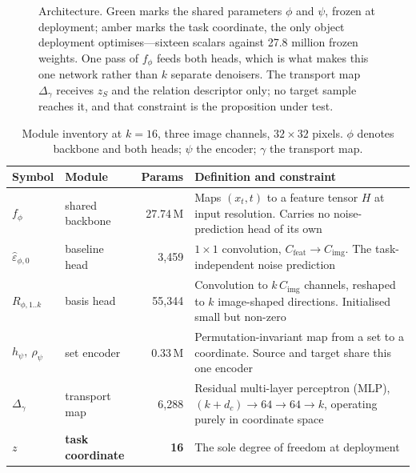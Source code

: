 \documentclass[11pt]{article}
\newcommand{\epshat}{\hat{\varepsilon}}
\newcommand{\zS}{z_{S}}
\begin{document}
\begin{figure}[htbp]
{}


\caption{Architecture. Green marks the shared parameters $\phi$ and $\psi$, frozen at deployment;
amber marks the task coordinate, the only object deployment optimises---sixteen scalars against
27.8 million frozen weights. One pass of $f_\phi$ feeds both heads, which is what makes this one
network rather than $k$ separate denoisers. The transport map $\Delta_\gamma$ receives $\zS$ and
the relation descriptor only; no target sample reaches it, and that constraint is the proposition
under test.}
\label{fig:arch}
\end{figure}

\begin{table}[htbp]
\centering\small
\begin{tabular}{@{}llr p{7.0cm}@{}}
\toprule
\textbf{Symbol} & \textbf{Module} & \textbf{Params} & \textbf{Definition and constraint} \\
\midrule
$f_\phi$ & shared backbone & 27.74\,M
  & Maps $(x_t,t)$ to a feature tensor $H$ at input resolution. Carries no
    noise-prediction head of its own \\[2pt]
$\epshat_{\phi,0}$ & baseline head & 3{,}459
  & $1\times1$ convolution, $C_{\text{feat}}\!\to\!C_{\text{img}}$. The task-independent
    noise prediction \\[2pt]
$R_{\phi,1..k}$ & basis head & 55{,}344
  & Convolution to $k\,C_{\text{img}}$ channels, reshaped to $k$ image-shaped directions.
    Initialised small but non-zero \\[2pt]
$h_\psi,\ \rho_\psi$ & set encoder & 0.33\,M
  & Permutation-invariant map from a set to a coordinate. Source and target share this
    one encoder \\[2pt]
$\Delta_\gamma$ & transport map & 6{,}288
  & Residual multi-layer perceptron (MLP), $(k+d_c)\!\to\!64\!\to\!64\!\to\!k$, operating
    purely in coordinate space \\[2pt]
$z$ & \textbf{task coordinate} & \textbf{16}
  & The sole degree of freedom at deployment \\
\bottomrule
\end{tabular}
\caption{Module inventory at $k=16$, three image channels, $32\times32$ pixels. $\phi$ denotes
backbone and both heads; $\psi$ the encoder; $\gamma$ the transport map.}
\end{table}
\end{document}
